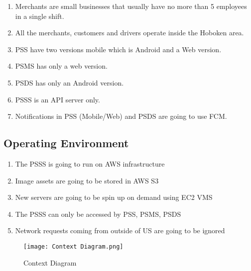 \pagebreak

\begin{enumerate}[resume, label=AS-\arabic*]
    \item Merchants are small businesses that usually have no more 
    than 5 employees in a single shift.
    \item All the merchants, customers and drivers operate inside the 
    Hoboken area.
    \item PSS have two versions mobile which is Android and a Web version.
    \item PSMS has only a web version.
    \item PSDS has only an Android version.
    \item PSSS is an API server only.
    \item Notifications in PSS (Mobile/Web) and PSDS are going to use FCM.
\end{enumerate}

\pagebreak

\subsection{Operating Environment}
\begin{enumerate}[label=OE-\arabic*]
    \item The PSSS is going to run on AWS infrastructure
    \item Image assets are going to be stored in AWS S3
    \item New servers are going to be spin up on demand using EC2 VMS
    \item The PSSS can only be accessed by PSS, PSMS, PSDS 
    \item Network requests coming from outside of US are going to be ignored
\end{enumerate}
\begin{figure}[!htb]
    \centering
    \texttt{[image: Context Diagram.png]}
    \caption{Context Diagram}
\end{figure}